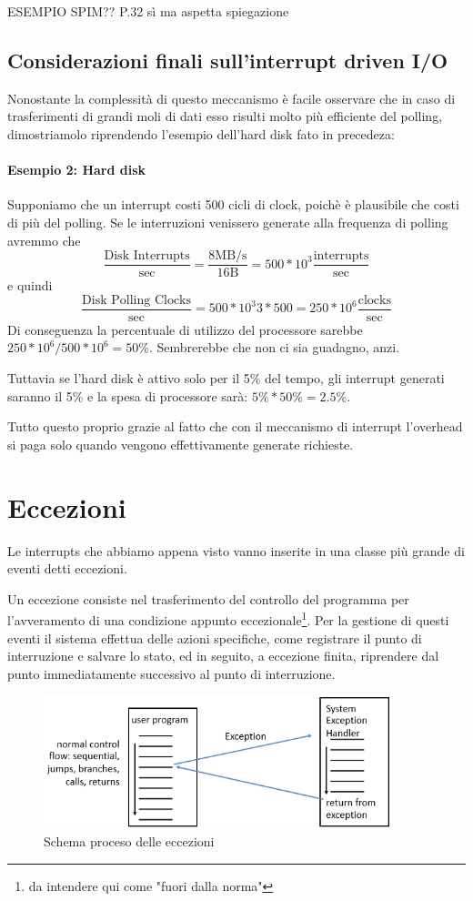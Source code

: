 \documentclass[class=book, crop=false, oneside]{standalone}
\begin{document}
ESEMPIO SPIM?? P.32 sì ma aspetta spiegazione

\subsection{Considerazioni finali sull'interrupt driven I/O}
Nonostante la complessità di questo meccanismo è facile osservare che in caso di trasferimenti di grandi moli di dati esso risulti  molto più efficiente del polling, dimostriamolo riprendendo l'esempio dell'hard disk fato in precedeza:

\paragraph{Esempio 2: Hard disk} Supponiamo che un interrupt costi 500 cicli di clock, poichè è plausibile che costi di più del polling.
Se le interruzioni venissero generate alla frequenza di polling avremmo che \[\frac{\textrm{Disk Interrupts}}{\textrm{sec}}=\frac{8 \textrm{MB/s}}{16\textrm{B}}=500*10^{3}\frac{\textrm{interrupts}}{\textrm{sec}}\] e quindi \[\frac{\textrm{Disk Polling Clocks}}{\textrm{sec}}=500*10^3{3}*500=250*10^{6} \frac{\textrm{clocks}}{\textrm{sec}}\] Di conseguenza la percentuale di utilizzo del processore sarebbe \(250*10^{6}/500*10^{6}= 50\%\). Sembrerebbe che non ci sia guadagno, anzi.

Tuttavia se l’hard disk è attivo solo per il 5\% del tempo, gli interrupt generati saranno il 5\% e la spesa di processore sarà: \(5\% * 50\%=2.5\%\).

Tutto questo proprio grazie al fatto che con il meccanismo di interrupt l’overhead si paga solo quando vengono effettivamente generate richieste.

\section{Eccezioni}
Le interrupts che abbiamo appena visto vanno inserite in una classe più grande di eventi detti eccezioni.

Un eccezione consiste nel trasferimento del controllo del programma per l'avveramento di una condizione appunto eccezionale\footnote{da intendere qui come "fuori dalla norma"}.
Per la gestione di questi eventi il sistema effettua delle azioni specifiche, come registrare il punto di interruzione e salvare lo stato, ed in seguito, a eccezione finita, riprendere dal punto immediatamente successivo al punto di interruzione.

\begin{figure}[H]
	\centering
	\includegraphics[width=0.9\textwidth,keepaspectratio]{schema-eccezioni}
	\caption{Schema proceso delle eccezioni}
\end{figure}
\end{document}
